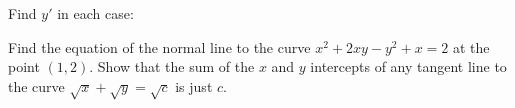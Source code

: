 \begin{questions}
  \question Find $ y' $ in each case:
  \question Find the equation of the normal line to the curve $ x^2 + 2xy - y^2 + x = 2 $ at the point $ (1, 2) $.
  \question Show that the sum of the $ x $ and $ y $ intercepts of any tangent line to the curve $ \sqrt{x} + \sqrt{y} = \sqrt{c} $
            is just $ c $.
\end{questions}

